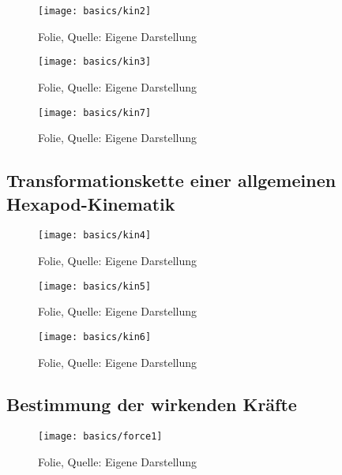 \begin{figure}[H]
    \centering
    \texttt{[image: basics/kin2]}
    \caption[Folie]{Folie, Quelle: Eigene Darstellung}
    \label{fig:kin2}
\end{figure}

\begin{figure}[H]
    \centering
    \texttt{[image: basics/kin3]}
    \caption[Folie]{Folie, Quelle: Eigene Darstellung}
    \label{fig:kin3}
\end{figure}

\begin{figure}[H]
    \centering
    \texttt{[image: basics/kin7]}
    \caption[Folie]{Folie, Quelle: Eigene Darstellung}
    \label{fig:kin7}
\end{figure}

\subsection{Transformationskette einer allgemeinen Hexapod-Kinematik}
\label{basics-chain_of_transformation}

\begin{figure}[H]
    \centering
    \texttt{[image: basics/kin4]}
    \caption[Folie]{Folie, Quelle: Eigene Darstellung}
    \label{fig:kin4}
\end{figure}

\begin{figure}[H]
    \centering
    \texttt{[image: basics/kin5]}
    \caption[Folie]{Folie, Quelle: Eigene Darstellung}
    \label{fig:kin5}
\end{figure}

\begin{figure}[H]
    \centering
    \texttt{[image: basics/kin6]}
    \caption[Folie]{Folie, Quelle: Eigene Darstellung}
    \label{fig:kin6}
\end{figure}

\subsection{Bestimmung der wirkenden Kräfte}
\label{basics-forces}

\begin{figure}[H]
    \centering
    \texttt{[image: basics/force1]}
    \caption[Folie]{Folie, Quelle: Eigene Darstellung}
    \label{fig:force1}
\end{figure}

